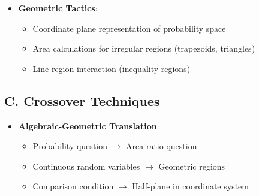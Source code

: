 \documentclass[]{article}
\begin{document}
\begin{tacticalbox}
\begin{itemize}[leftmargin=*]
    \item \textbf{Geometric Tactics}:
    \begin{itemize}
        \item Coordinate plane representation of probability space
        \item Area calculations for irregular regions (trapezoids, triangles)
        \item Line-region interaction (inequality regions)
    \end{itemize}
\end{itemize}

\subsection*{C. Crossover Techniques}
\begin{itemize}[leftmargin=*]
    \item \textbf{Algebraic-Geometric Translation}:
    \begin{itemize}
        \item Probability question $\rightarrow$ Area ratio question
        \item Continuous random variables $\rightarrow$ Geometric regions
        \item Comparison condition $\rightarrow$ Half-plane in coordinate system
    \end{itemize}
\end{itemize}
\end{tacticalbox}
\end{document}
